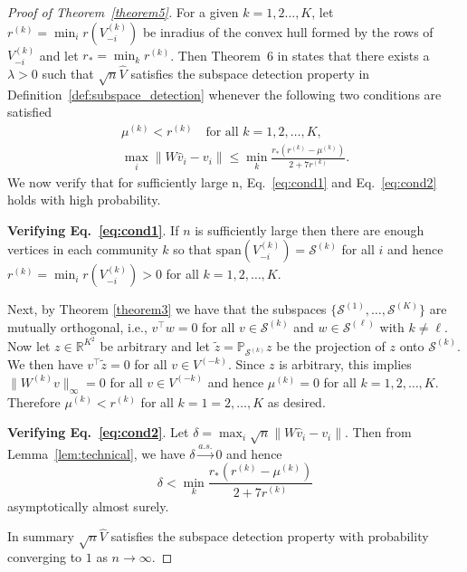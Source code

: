 \documentclass[12pt]{article}
\begin{document}
\begin{proof}[Proof of Theorem~\ref{theorem5}]
For a given $k = 1,2\dots,K$, let $r^{(k)} = \min_{i}r(V_{-i}^{(k)})$ be inradius of the convex hull formed by
the rows of $V_{-i}^{(k)}$ and let $r_* = \min_{k} r^{(k)}$. Then Theorem~6 in
\citet{jmlr-v28-wang13} states that there exists a $\lambda > 0$
such that $\sqrt{n} \hat{V}$ satisfies
the subspace detection property in
Definition~\ref{def:subspace_detection} whenever
the following two conditions are satisfied
\begin{gather}
  \label{eq:cond1}
  \mu^{(k)} < r^{(k)} \quad \text{for all $k = 1,2,\dots,K$}, \\
  \label{eq:cond2}
  \max_{i} \|W \hat{v}_{i} - v_{i}\| \leq \min_{k} \frac{r_*(r^{(k)} -
    \mu^{(k)})}{2 + 7 r^{(k)}}.
\end{gather}
We now verify that for sufficiently large n, Eq.~\eqref{eq:cond1} and Eq.~\eqref{eq:cond2}
holds with high probability.

{\bf Verifying Eq.~\eqref{eq:cond1}}. If $n$ is sufficiently large then
there are enough vertices in each community $k$ so that
$\mathrm{span}(V_{-i}^{(k)}) = \mathcal{S}^{(k)}$ for all $i$ and hence
\(r^{(k)} = \min_{i} r(V_{-i}^{(k)}) > 0\) for
all $k = 1,2,\dots,K$. 

Next, by Theorem \ref{theorem3} we have that the subspaces
  $\{\mathcal{S}^{(1)}, \dots, \mathcal{S}^{(K)}\}$
  are mutually orthogonal, i.e., $v^{\top} w = 0$ for all $v \in
  \mathcal{S}^{(k)}$ and $w \in \mathcal{S}^{(\ell)}$ with $k \not =
  \ell$. Now let $z \in \mathbb{R}^{K^2}$ be arbitrary and let
  $\tilde{z} = \mathbb{P}_{\mathcal{S}^{(k)}} z$ be the projection of
    $z$ onto $\mathcal{S}^{(k)}$. We then have $v^{\top} \tilde{z} =
    0$ for all $v \in V^{(-k)}$. Since $z$ is arbitrary, this implies $\|W^{(k)} v\|_{\infty} = 0$ for all $v
    \in V^{(-k)}$ and hence $\mu^{(k)} = 0$ for all $k
    =1,2,\dots,K$. Therefore $\mu^{(k)} < r^{(k)}$ for all $k =
    1=2,\dots,K$ as desired.

{\bf Verifying Eq.~\eqref{eq:cond2}}.
Let $\delta = \max_{i} \sqrt{n} \|W
\hat{v}_{i} - v_{i}\|$. Then from Lemma~\ref{lem:technical}, we have
\(\delta \stackrel{a.s.}{\to} 0\) and hence
$$\delta < \min_{k} \frac{r_* (r^{(k)} - \mu^{(k)})}{2 + 7 r^{(k)}}$$
asymptotically almost surely. 

In summary $\sqrt{n} \hat{V}$ satisfies the subspace detection property
with probability converging to $1$ as \(n \to \infty\).
\end{proof}
\end{document}
